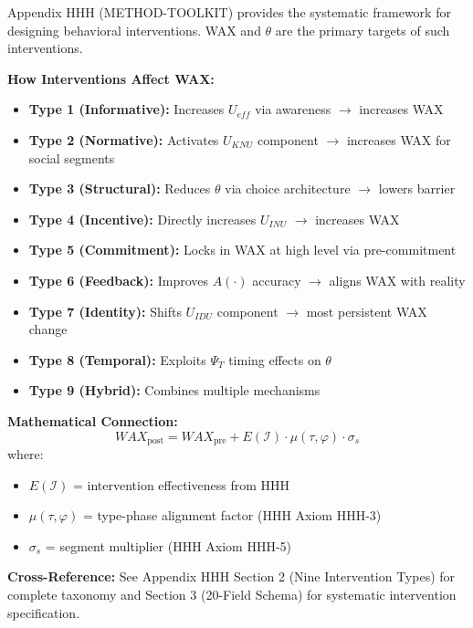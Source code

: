 \begin{tcolorbox}[colback=orange!5!white, colframe=orange!75!black,
    title=\textbf{HHH Integration: Intervention Design Toolkit}]

Appendix HHH (METHOD-TOOLKIT) provides the systematic framework for designing
behavioral interventions. WAX and $\theta$ are the primary targets of such interventions.

\textbf{How Interventions Affect WAX:}
\begin{itemize}[nosep]
    \item \textbf{Type 1 (Informative):} Increases $U_{eff}$ via awareness $\to$ increases WAX
    \item \textbf{Type 2 (Normative):} Activates $U_{KNU}$ component $\to$ increases WAX for social segments
    \item \textbf{Type 3 (Structural):} Reduces $\theta$ via choice architecture $\to$ lowers barrier
    \item \textbf{Type 4 (Incentive):} Directly increases $U_{INU}$ $\to$ increases WAX
    \item \textbf{Type 5 (Commitment):} Locks in WAX at high level via pre-commitment
    \item \textbf{Type 6 (Feedback):} Improves $A(\cdot)$ accuracy $\to$ aligns WAX with reality
    \item \textbf{Type 7 (Identity):} Shifts $U_{IDU}$ component $\to$ most persistent WAX change
    \item \textbf{Type 8 (Temporal):} Exploits $\Psi_T$ timing effects on $\theta$
    \item \textbf{Type 9 (Hybrid):} Combines multiple mechanisms
\end{itemize}

\textbf{Mathematical Connection:}
\begin{equation}
WAX_{\text{post}} = WAX_{\text{pre}} + E(\mathcal{I}) \cdot \mu(\tau, \varphi) \cdot \sigma_s
\label{eq:av-hhh-wax-change}
\end{equation}
where:
\begin{itemize}[nosep]
    \item $E(\mathcal{I})$ = intervention effectiveness from HHH
    \item $\mu(\tau, \varphi)$ = type-phase alignment factor (HHH Axiom HHH-3)
    \item $\sigma_s$ = segment multiplier (HHH Axiom HHH-5)
\end{itemize}

\textbf{Cross-Reference:} See Appendix HHH Section 2 (Nine Intervention Types) for complete taxonomy
and Section 3 (20-Field Schema) for systematic intervention specification.

\end{tcolorbox}

